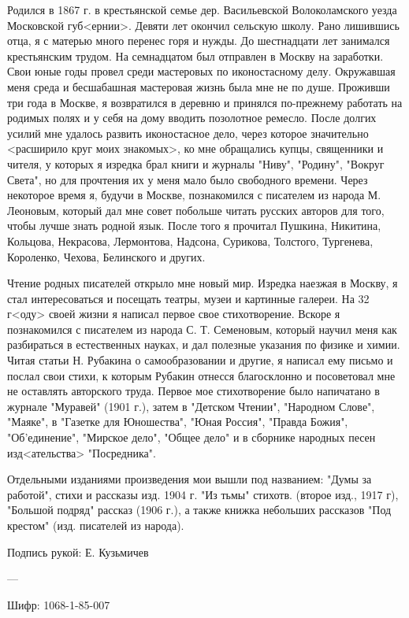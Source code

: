 \documentclass[]{memoir}
\begin{document}
Родился в 1867 г. в крестьянской семье дер. Васильевской Волоколамского уезда Московской губ<ернии>. Девяти лет окончил сельскую школу. Рано лишившись отца, я с матерью много перенес горя и нужды. До шестнадцати лет занимался крестьянским трудом. На семнадцатом был отправлен в Москву на заработки. Свои юные годы провел среди мастеровых по иконостасному делу. Окружавшая меня среда и бесшабашная мастеровая жизнь была мне не по душе. Проживши три года в Москве, я возвратился в деревню и принялся по-прежнему работать на родимых полях и у себя на дому вводить позолотное ремесло. После долгих усилий мне удалось развить иконостасное дело, через которое значительно <расширило круг моих знакомых>, ко мне обращались купцы, священники и чителя, у которых я изредка брал книги и журналы "Ниву", "Родину", "Вокруг Света", но для прочтения их у меня мало было свободного времени. Через некоторое время я, будучи в Москве, познакомился с писателем из народа М. Леоновым, который дал мне совет побольше читать русских авторов для того, чтобы лучше знать родной язык. После того я прочитал Пушкина, Никитина, Кольцова, Некрасова, Лермонтова, Надсона, Сурикова, Толстого, Тургенева, Короленко, Чехова, Белинского и других.

Чтение родных писателей открыло мне новый мир. Изредка наезжая в Москву, я стал интересоваться и посещать театры, музеи и картинные галереи. На 32 г<оду> своей жизни я написал первое свое стихотворение. Вскоре я познакомился с писателем из народа С. Т. Семеновым, который научил меня как разбираться в естественных науках, и дал полезные указания по физике и химии. Читая статьи Н. Рубакина о самообразовании и другие, я написал ему письмо и послал свои стихи, к которым Рубакин отнесся благосклонно и посоветовал мне не оставлять авторского труда. Первое мое стихотворение было напичатано в журнале "Муравей" (1901 г.), затем в "Детском Чтении", "Народном Слове", "Маяке", в "Газетке для Юношества", "Юная Россия", "Правда Божия", "Об'единение", "Мирское дело", "Общее дело" и в сборнике народных песен изд<ательства> "Посредника". 

Отдельными изданиями произведения мои вышли под названием: "Думы за работой", стихи и рассказы изд. 1904 г. "Из тьмы" стихотв. (второе изд., 1917 г), "Большой подряд" рассказ (1906 г.), а также книжка небольших рассказов "Под крестом" (изд. писателей из народа).

Подпись рукой: Е. Кузьмичев

---

Шифр:   1068-1-85-007
\end{document}
